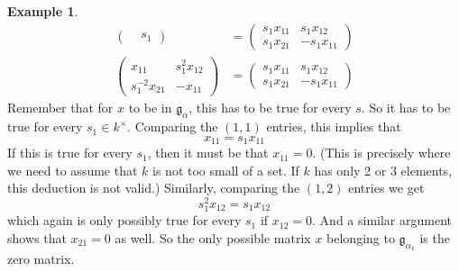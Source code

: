 \documentclass[12pt]{article}
\theoremstyle{definition}
\newtheorem{example}[theorem]{Example}
\newcommand{\frakg}{\mathfrak{g}}
\begin{document}
\begin{example}
\begin{align*}
\begin{pmatrix}
		& s_1
	\end{pmatrix}
	&=
	\begin{pmatrix}
		s_1 x_{11} &  s_1 x_{12} \\
		s_1 x_{21} & - s_1 x_{11}
	\end{pmatrix} \\
	\begin{pmatrix}
		x_{11} & s_1^2 x_{12} \\
		s_1^{-2} x_{21} & - x_{11}
	\end{pmatrix}
	&=
	\begin{pmatrix}
		s_1 x_{11} &  s_1 x_{12} \\
		s_1 x_{21} & - s_1 x_{11}
	\end{pmatrix} 
\end{align*}
Remember that for $x$ to be in $\frakg_{\alpha}$, this has to be true for every $s$. So it has to be true for every $s_1 \in k^\times$. Comparing the $(1,1)$ entries, this implies that
\[
	x_{11} = s_1 x_{11}
\]
If this is true for every $s_1$, then it must be that $x_{11} = 0$. (This is precisely where we need to assume that $k$ is not too small of a set. If $k$ has only 2 or 3 elements, this deduction is not valid.) Similarly, comparing the $(1,2)$ entries we get
\[
	s_1^2 x_{12} = s_1 x_{12}
\]
which again is only possibly true for every $s_1$ if $x_{12} = 0$. And a similar argument shows that $x_{21} = 0$ as well. So the only possible matrix $x$ belonging to $\frakg_{\alpha_1}$ is the zero matrix.
\end{example}
\end{document}
